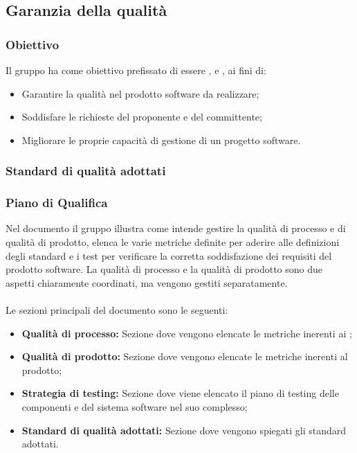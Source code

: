 \subsection{Garanzia della qualità}
\subsubsection{Obiettivo}
Il gruppo \Gruppo{} ha come obiettivo prefissato di essere ,  e , ai fini di:
\begin{itemize}
    \item Garantire la qualità nel prodotto software da realizzare;
    \item Soddisfare le richieste del proponente e del committente;
    \item Migliorare le proprie capacità di gestione di un progetto software.
\end{itemize}

\subsubsection{Standard di qualità adottati}



\subsubsection{Piano di Qualifica}
Nel documento \PdQ{} il gruppo \Gruppo{} illustra come intende gestire la qualità di processo e di qualità di prodotto, elenca le varie metriche definite per aderire alle definizioni degli standard e i test per verificare la corretta soddisfazione dei requisiti del prodotto software.
La qualità di processo e la qualità di prodotto sono due aspetti chiaramente coordinati, ma vengono gestiti separatamente. \\ \\
Le sezioni principali del documento sono le seguenti:
\begin{itemize}
    \item \textbf{Qualità di processo:} Sezione dove vengono elencate le metriche inerenti ai ;
    \item \textbf{Qualità di prodotto:} Sezione dove vengono elencate le metriche inerenti al prodotto;
    \item \textbf{Strategia di testing:} Sezione dove viene elencato il piano di testing delle componenti e del sistema software nel suo complesso;
    \item \textbf{Standard di qualità adottati:} Sezione dove vengono spiegati gli standard adottati.
\end{itemize}

